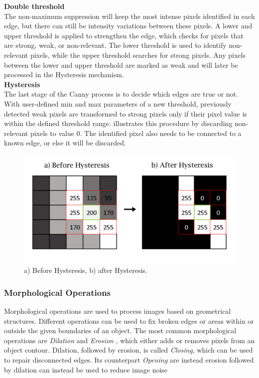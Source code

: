\noindent \textbf{Double threshold}\\
\noindent The non-maximum suppression will keep the most intense pixels identified in each edge, but there can still be intensity variations between these pixels. A lower and upper threshold is applied to strengthen the edge, which checks for pixels that are strong, weak, or non-relevant. The lower threshold is used to identify non-relevant pixels, while the upper threshold searches for strong pixels. Any pixels between the lower and upper threshold are marked as weak and will later be processed in the Hysteresis mechanism.\\ 

\noindent \textbf{Hysteresis}\\
\noindent The last stage of the Canny process is to decide which edges are true or not. With user-defined min and max parameters of a new threshold, previously detected weak pixels are transformed to strong pixels only if their pixel value is within the defined threshold range.  illustrates this procedure by discarding non-relevant pixels to value 0. The identified pixel also needs to be connected to a known edge, or else it will be discarded. \\

\begin{figure}[htbp]
    \centering
    \includegraphics[width=.65\linewidth]{figures/PDF/Hysteresis.pdf}
    \caption{a) Before Hysteresis, b) after Hysteresis.}
    \label{fig:hysteresis}
\end{figure}

\subsubsection{Morphological Operations}
Morphological operations are used to process images based on geometrical structures. Different operations can be used to fix broken edges or areas within or outside the given boundaries of an object. The most common morphological operations are \textit{Dilation} and \textit{Erosion} \cite{Raid}, which either adds or removes pixels from an object contour. Dilation, followed by erosion, is called \textit{Closing}, which can be used to repair disconnected edges. Its counterpart \textit{Opening} are instead erosion followed by dilation can instead be used to reduce image noise \\

